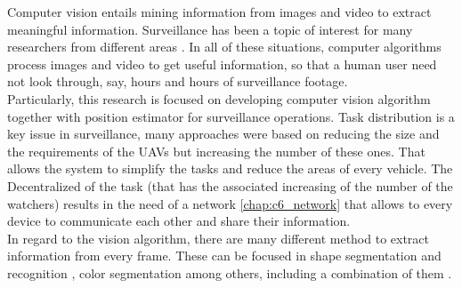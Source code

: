Computer vision entails mining information from images and video to extract meaningful information. Surveillance has been a topic of interest for many researchers from different areas \cite{traffic_surveillance_pergamon} \cite{distributed_surveillance} \cite{vehicle_detection}. In all of these situations, computer algorithms process images and video to get useful information, so that a human user need not look through, say, hours and hours of surveillance footage. \\

Particularly, this research is focused on developing computer vision algorithm together with position estimator for surveillance operations. Task distribution \cite{Coop_Surv_aerial_JJ} \cite{Consensus_reaching_Xiao} \cite{Adaptative_tast_Meuth} \cite{distributed_architecture_Ivan_Maza}  is a key issue in surveillance, many approaches were based on reducing the size and the requirements of the UAVs but increasing the number of these ones. That allows the system to simplify the tasks and reduce the areas of every vehicle. The Decentralized of the task \cite{descentralized_task_UAV} (that has the associated increasing of the number of the watchers) results in the need of a network \ref{chap:c6_network} that allows to every device to communicate each other and share their information. \\

In regard to the vision algorithm, there are many different method to extract information from every frame. These can be focused in shape segmentation and recognition \cite{shape_using_shape_context} \cite{Vehicle_recog_markov}, color segmentation among others, including a combination of them \cite{realtime_signal_recon_shape_color} \cite{signal_recogn_shape_color} \cite{Robust_RT_tracking_color_face_Darrell}.


